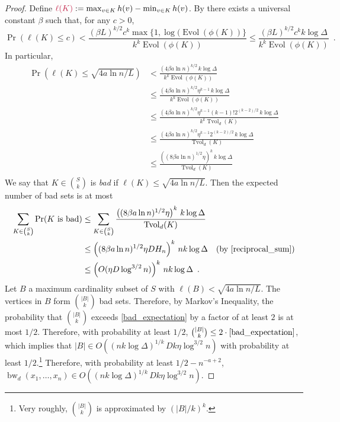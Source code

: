 \documentclass{patmorin}
\makeatletter
\newcommand{\defin}[1]{\emph{\textcolor{brightmaroon}{#1}}}
\def\mathcolor#1#{\@mathcolor{#1}}
\def\@mathcolor#1#2#3{%
  \protect\leavevmode
  \begingroup
    \color#1{#2}#3%
  \endgroup
}
\newcommand{\mathdefin}[1]{\mathcolor{brightmaroon}{#1}}
\DeclareMathOperator{\bw}{bw}
\DeclareMathOperator{\evol}{Evol}
\DeclareMathOperator{\tvol}{Tvol}
\makeatother
\begin{document}
\begin{proof}
  Define $\mathdefin{\ell(K)}:=\max_{v\in K}h(v)-\min_{v\in K} h(v)$.  By \cite[Theorem~9]{feige:approximating} there exists a universal constant $\beta$ such that, for any $c>0$,
  \[
      \Pr(\ell(K) \le c)
        < \frac{(\beta L)^{k/2}c^k\max\{1,\log(\evol(\phi(K))\}}{k^k\evol(\phi(K))}
        \le \frac{(\beta L)^{k/2}c^kk\log\Delta}{k^k\evol(\phi(K))} \enspace .
  \]
  In particular,
  \begin{align*}
    \Pr(\ell(K) \le \sqrt{4a\ln n/L})
      & <
      \frac{(4\beta a\ln n)^{k/2}\, k\log\Delta}{k^k\evol(\phi(K))} \\
      & \le \frac{(4\beta a\ln n)^{k/2}\eta^{k-1}\, k\log\Delta}{k^k\evol(\phi(K))} \\
      & \le \frac{(4\beta a\ln n)^{k/2}\eta^{k-1}(k-1)!2^{(k-2)/2}\, k\log\Delta}{k^k\tvol_{d}(K)} \\
      & \le \frac{(4\beta a\ln n)^{k/2}\eta^{k-1}2^{(k-2)/2}\,k\log\Delta}{\tvol_{d}(K)} \\
      & \le \frac{\left((8\beta a\ln n)^{1/2}\eta\right)^{k}\,k\log\Delta}{\tvol_{d}(K)} \\
  \end{align*}
  We say that $K\in\binom{S}{k}$ is \defin{bad} if $\ell(K) \le \sqrt{4a\ln n/L}$. Then the expected number of bad sets is at most
  \begin{align}
    \sum_{K\in \binom{S}{k}} \Pr(\text{$K$ is bad})
    & \le \sum_{K\in \binom{S}{k}} \frac{\left((8\beta a\ln n)^{1/2}\eta\right)^{k}\, k\log\Delta}{\tvol_{d}(K)} \notag \\
    & \le \left((8\beta a\ln n)^{1/2}\eta DH_n\right)^{k}\, nk\log\Delta
    & \text{(by \cref{reciprocal_sum})} \notag \\
    & \le \left(O(\eta D\log^{3/2}n)\right)^{k}\, nk\log\Delta \enspace .
    \label{bad_expectation}
  \end{align}
  Let $B$ a maximum cardinality subset of $S$ with $\ell(B)<\sqrt{4a\ln n/L}$.  The vertices in $B$ form $\binom{|B|}{k}$ bad sets. Therefore, by Markov's Inequality, the probability that $\binom{|B|}{k}$ exceeds \eqref{bad_expectation} by a factor of at least $2$ is at most $1/2$.  Therefore, with probability at least $1/2$, $\binom{|B|}{k}\le 2\cdot\eqref{bad_expectation}$, which implies that $|B|\in O((nk\log\Delta)^{1/k}\,Dk\eta\log^{3/2} n)$ with probability at least $1/2$.\footnote{Very roughly, $\binom{|B|}{k}$ is approximated by $(|B|/k)^k$.}  Therefore, with probability at least $1/2-n^{-a+2}$, $\bw_d(x_1,\ldots,x_n)\in O((nk\log\Delta)^{1/k}\,Dk\eta\log^{3/2} n)$.
\end{proof}
\end{document}

